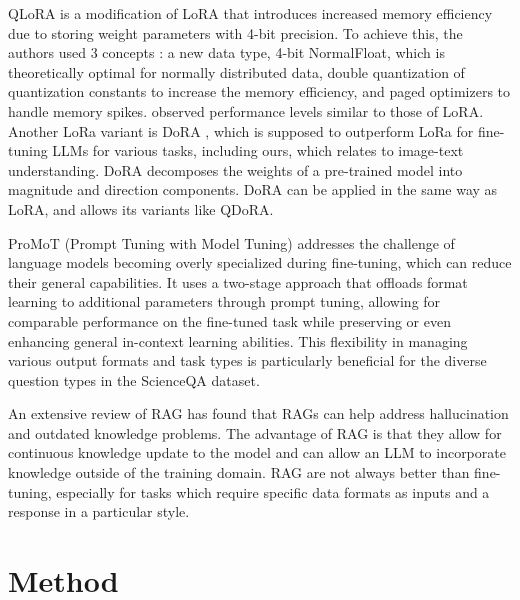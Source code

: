 \documentclass{article}
\begin{document}
QLoRA \cite{qlora} is a modification of LoRA that introduces increased memory efficiency due to storing weight parameters with 4-bit precision. To achieve this, the authors used 3 concepts : a new data type, 4-bit NormalFloat, which is theoretically optimal for normally distributed data, double quantization of quantization constants to increase the memory efficiency, and paged optimizers to handle memory spikes. \cite{qlora} observed performance levels similar to those of LoRA. Another LoRa variant is DoRA \cite{dora}, which is supposed to outperform LoRa for fine-tuning LLMs for various tasks, including ours, which relates to image-text understanding. DoRA decomposes the weights of a pre-trained model into magnitude and direction components. DoRA can be applied in the same way as LoRA, and allows its variants like QDoRA.\par

ProMoT (Prompt Tuning with Model Tuning) \cite{valizadehaslani2022twostagefinetuningnovelstrategy} addresses the challenge of language models becoming overly specialized during fine-tuning, which can reduce their general capabilities. It uses a two-stage approach that offloads format learning to additional parameters through prompt tuning, allowing for comparable performance on the fine-tuned task while preserving or even enhancing general in-context learning abilities. This flexibility in managing various output formats and task types is particularly beneficial for the diverse question types in the ScienceQA dataset.\par

An extensive review of RAG \cite{ragreview} has found that RAGs can help address hallucination and outdated knowledge problems. The advantage of RAG is that they allow for continuous knowledge update to the model and can allow an LLM to incorporate knowledge outside of the training domain. RAG are not always better than fine-tuning, especially for tasks which require specific data formats as inputs and a response in a particular style.\par



\section{Method}
\label{sec:method}
\end{document}
